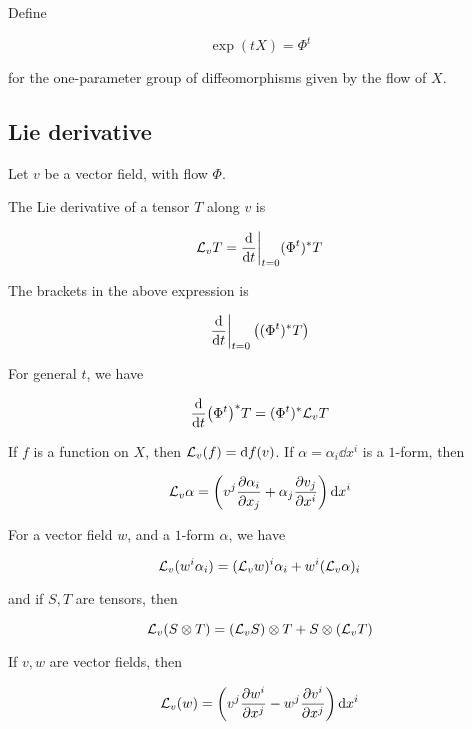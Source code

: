 \begin{definition}

    Define

    \[\exp(tX) = \Phi^t\]

    for the one-parameter group of diffeomorphisms given by the flow of \(X\).
\end{definition}

\subsection{Lie derivative}

Let \(v\) be a vector field, with flow \(\Phi\).

\begin{definition}

    The Lie derivative of a tensor \(T\) along \(v\) is

    \[\mathcal{L}_vT = \dv{t}\bigg\vert_{t=0}(\Phi^t)^*T\]
\end{definition}

\begin{remark}
    The brackets in the above expression is

    \[\dv{t}\bigg\vert_{t=0}\left((\Phi^t)^*T\right)\]
\end{remark}

\begin{lemma}
    For general \(t\), we have

    \[\dv{t}(\Phi^t)^*T = (\Phi^t)^*\mathcal{L}_vT\]
\end{lemma}

\begin{lemma}
    If \(f\) is a function on \(X\), then \(\mathcal{L}_v(f) = \dd f(v)\). If \(\alpha = \alpha_i \dd x^i\) is a \(1\)-form, then

    \[\mathcal{L}_v\alpha = \left(v^j\pdv{\alpha_i}{x_j} + \alpha_j\pdv{v_j}{x^i}\right)\dd x^i\]
\end{lemma}

\begin{lemma}
    For a vector field \(w\), and a \(1\)-form \(\alpha\), we have

    \[\mathcal{L}_v(w^i\alpha_i) = (\mathcal{L}_v w)^i \alpha_i + w^i(\mathcal{L}_v\alpha)_i\]

    and if \(S, T\) are tensors, then

    \[\mathcal{L}_v(S \otimes T) = (\mathcal{L}_v S)\otimes T + S \otimes (\mathcal{L}_v T)\]
\end{lemma}

\begin{corollary}
    If \(v, w\) are vector fields, then

    \[\mathcal{L}_v(w) = \left(v^j \pdv{w^i}{x^j} - w^j\pdv{v^i}{x^j}\right)\dd x^i\]
\end{corollary}

